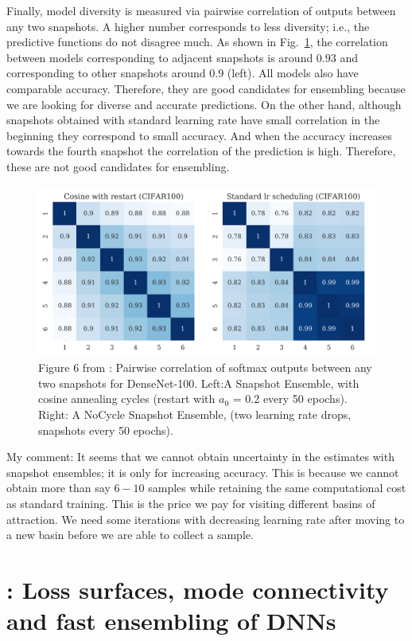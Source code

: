 Finally, model diversity is measured via pairwise correlation of outputs between any two snapshots.
A higher number corresponds to less diversity; i.e., the predictive functions do not disagree much.
As shown in Fig.~\ref{huangdiversity}, the correlation between models corresponding to adjacent snapshots is around $0.93$ and corresponding to other snapshots around $0.9$ (left).
All models also have comparable accuracy.
Therefore, they are good candidates for ensembling because we are looking for diverse and accurate predictions.
On the other hand, although snapshots obtained with standard learning rate have small correlation in the beginning they correspond to small accuracy.
And when the accuracy increases towards the fourth snapshot the correlation of the prediction is high.
Therefore, these are not good candidates for ensembling.
\begin{figure}[H]
	\centering
	\includegraphics[width=0.7\linewidth]{./Figures/huangdiversity.png}
	\caption{Figure 6 from \textcite{huang2017snapshot}: Pairwise correlation of softmax outputs between any two snapshots for DenseNet-100. Left:A Snapshot Ensemble, with cosine annealing cycles (restart with $a_0$ = 0.2 every 50 epochs). Right: A NoCycle Snapshot Ensemble, (two learning rate drops, snapshots every 50 epochs).
}
	\label{huangdiversity}
\end{figure}

My comment: It seems that we cannot obtain uncertainty in the estimates with snapshot ensembles; it is only for increasing accuracy.
This is because we cannot obtain more than say $6-10$ samples while retaining the same computational cost as standard training.
This is the price we pay for visiting different basins of attraction. 
We need some iterations with decreasing learning rate after moving to a new basin before we are able to collect a sample.

\section{\textcite{garipov2018loss}: Loss surfaces, mode connectivity and fast ensembling of DNNs}

